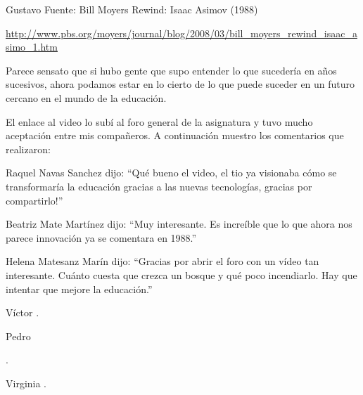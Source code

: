 \begin{opin}{\guscolor}{Gustavo}
Fuente: Bill Moyers Rewind: Isaac Asimov (1988)

\href{http://www.pbs.org/moyers/journal/blog/2008/03/bill\_moyers\_rewind\_isaac\_asimo\_1.html}{http://www.pbs.org/moyers/journal/blog/2008/03/bill\_moyers\_rewind\_isaac\_asimo\_1.htm}

Parece sensato que si hubo gente que supo entender lo que sucedería en años sucesivos, ahora podamos estar en lo cierto de lo que puede suceder en un futuro cercano en el mundo de la educación.

El enlace al video lo subí al foro general de la asignatura y tuvo mucho aceptación entre mis compañeros. A continuación muestro los comentarios que realizaron:

Raquel Navas Sanchez dijo: “Qué bueno el video, el tio ya visionaba cómo se transformaría la educación gracias a las nuevas tecnologías, gracias por compartirlo!”

Beatriz Mate Martínez dijo: “Muy interesante. Es increíble que lo que ahora nos parece innovación ya se comentara en 1988.” 

Helena Matesanz Marín dijo: “Gracias por abrir el foro con un vídeo tan interesante.  Cuánto cuesta que crezca un bosque y qué poco incendiarlo. Hay que intentar que mejore la educación.”


\end{opin}

\begin{opin}{\victorcolor}{Víctor}
.


\end{opin}

\begin{opin}{\pedrocolor}{Pedro}

.


\end{opin}

\begin{opin}{\virgicolor}{Virginia}
.


\end{opin}
